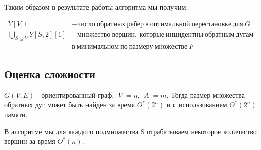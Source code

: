 Таким образом в результате работы алгоритма мы получим:

\begin{align*}
    Y[V, 1] &-число~обратных~ребер~в~оптимальной~перестановке~для~G \\ 
    \bigcup\limits_{S \subseteq V}Y[S, 2][1] &- множество~вершин,~которые~инцидентны 
    ~обратным~дугам \\
                                 &в~минимальном~по~размеру~множестве~F
\end{align*}

\subsection{Оценка сложности}

\begin{theorem}
    $G(V, E)$ - ориентированный граф, $|V| = n$, $|A| = m$.
    Тогда размер множества обратных дуг может быть найден за время $O^*(2^n)$
    и с использованием $O^*(2^n)$ памяти.
\end{theorem}

\proof
В алгоритме мы для каждого подмножества S отрабатываем некоторое количество 
вершин за время $O^*(n)$.













